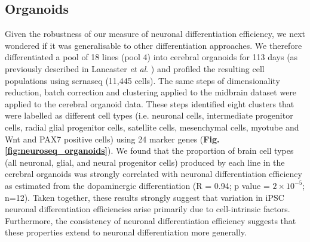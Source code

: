 \subsection{Organoids}
Given the robustness of our measure of neuronal differentiation efficiency, we next wondered if it was generalisable to other differentiation approaches. 
We therefore differentiated a pool of 18 lines (pool 4) into cerebral organoids for 113 days (as previously described in Lancaster \textit{et al}. \cite{lancaster2017guided}) and profiled the resulting cell populations using \gls{scrnaseq} (11,445 cells). 
The same steps of dimensionality reduction, batch correction and clustering applied to the midbrain dataset were applied to the cerebral organoid data. 
These steps identified eight clusters that were labelled as different cell types (i.e. neuronal cells, intermediate progenitor cells, radial glial progenitor cells, satellite cells, mesenchymal cells, myotube and Wnt and PAX7 positive cells) using 24 marker genes (\textbf{Fig. \ref{fig:neuroseq_organoids}}).
We found that the proportion of brain cell types (all neuronal, glial, and neural progenitor cells) produced by each line in the cerebral organoids was strongly correlated with neuronal differentiation efficiency as estimated from the dopaminergic differentiation (R = 0.94; p value = $2 \times 10^{-5}$; n=12). 
Taken together, these results strongly suggest that variation in iPSC neuronal differentiation efficiencies arise primarily due to cell-intrinsic factors. 
Furthermore, the consistency of neuronal differentiation efficiency suggests that these properties extend to neuronal differentiation more generally.

